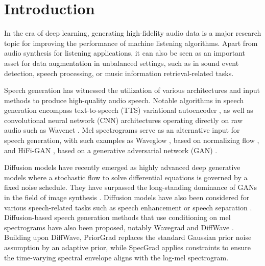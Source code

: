 \section{Introduction}

In the era of deep learning, generating high-fidelity audio data is a major research topic for improving the performance of machine listening algorithms.
Apart from audio synthesis for listening applications, it can also be seen as an important asset for data augmentation in unbalanced settings, such as in sound event detection, speech processing, or music information retrieval-related tasks.  


Speech generation has witnessed the utilization of various architectures and input methods to produce high-quality audio speech.
Notable algorithms in speech generation encompass text-to-speech (TTS) variational autoencoder \cite{lu21d_interspeech}, as well as convolutional neural network (CNN) architectures operating directly on raw audio %
such as Wavenet \cite{vanwavenet}. 
Mel spectrograms serve as an alternative input for speech generation, with such examples as Waveglow \cite{prenger2019waveglow}, based on normalizing flow \cite{rezende2015variational}, and HiFi-GAN \cite{kong2020hifi}, based on a generative adversarial network (GAN) \cite{goodfellow2014generative}. 
 

Diffusion models \cite{ho2020denoising, song2021scorebased} have recently emerged as highly advanced deep generative models where a stochastic flow to solve differential equations is governed by a fixed noise schedule.
They have surpassed the long-standing dominance of  GANs in the field of image synthesis \cite{huang2018introduction, liu2020generative, dhariwal2021diffusion}.
Diffusion models have also been considered for various speech-related tasks such as speech enhancement \cite{lemercier2023storm, richter2023speech, lu2022conditional} or speech separation \cite{scheibler2023diffusion, chen2023sepdiff}.
Diffusion-based speech generation methods that use conditioning on mel spectrograms have also been proposed, notably Wavegrad \cite{chen2020wavegrad} and DiffWave \cite{kong2020diffwave}. Building upon DiffWave,  PriorGrad \cite{lee2021priorgrad} replaces the standard Gaussian prior noise assumption by an adaptive prior, while SpecGrad \cite{koizumi2022specgrad} applies constraints to ensure the time-varying spectral envelope aligns with the log-mel spectrogram. 

